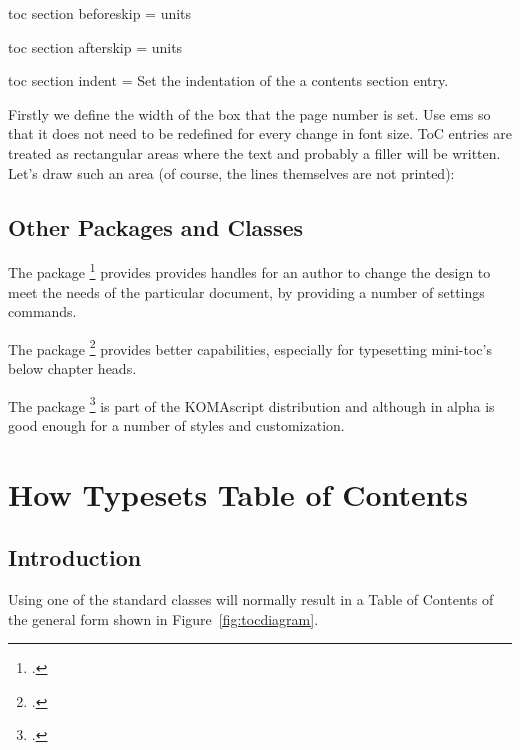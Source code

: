 \begin{docKey}[phd]{toc section beforeskip}{ = }{units}
\end{docKey}
\begin{docKey}[phd]{toc section afterskip}{ = }{units}
\end{docKey}
\begin{docKey}[phd]{toc section indent}{ = }{}
   Set the indentation of the a contents section entry. 
\end{docKey}


Firstly we define the width of the box that the page number is set. Use ems so that it does not need to be redefined for every change in font size.
ToC entries are treated as rectangular areas where the text
and probably a filler will be written. Let's draw such an
area (of course, the lines themselves are not printed):



\section{Other Packages and Classes}


The package \footcite{tocloft} provides  provides handles for an author to change the design to meet the needs of the particular document, by providing a number of settings commands.

The package \footcite{etoc} provides better capabilities, especially for typesetting mini-toc's below chapter heads.

The package \footcite{tocstyle} is part of the KOMAscript distribution and although in alpha is good enough
for a number of styles and customization.

\chapter{How \latexe Typesets Table of Contents}

\localtableofcontents

\section{Introduction}
Using one of the standard \latexe classes will normally result in a Table of Contents of the general form shown in Figure~\ref{fig:tocdiagram}.

